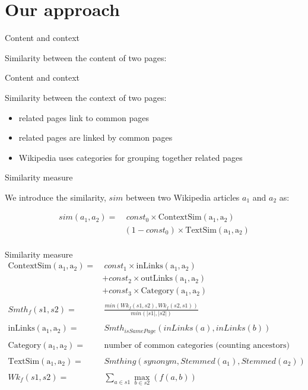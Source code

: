 \documentclass[xcolor=dvipsnames]{beamer}
\newcommand{\noargsim}{sim}
\newcommand{\wsim}[2]{\noargsim(#1,#2)}
\newcommand{\contextSim}[2]{\mathrm{ContextSim(#1,#2)}}
\newcommand{\textSim}[2]{\mathrm{TextSim(#1,#2)}}
\newcommand{\inLinks}[2]{\mathrm{inLinks(#1,#2)}}
\newcommand{\outLinks}[2]{\mathrm{outLinks(#1,#2)}}
\newcommand{\category}[2]{\mathrm{Category(#1,#2)}}
\newcommand{\wikiJack}[3]{Wk_#1(#2,#3)}
\newcommand{\Smthin}[3]{Smth_{#1}(#2,#3)}
\newcommand{\cst}[1]{const_#1}
\begin{document}
\section{Our approach}

\begin{frame}{Content and context}

Similarity between the content of two pages:




\end{frame}

\begin{frame}{Content and context}

Similarity between the context of two pages:

\begin{itemize}
\item related pages link to common pages 
\item related pages are linked by common pages
\item Wikipedia uses categories for grouping together related pages
\end{itemize}

\end{frame}

\begin{frame}{Similarity measure }

We introduce the similarity, $\noargsim$ between two Wikipedia articles $a_1$ and $a_2$ as:

\begin{align*}
	\wsim{a_1}{a_2} =&\ \cst{0} \times \contextSim{a_1}{a_2} \\
	& (1 - \cst{0}) \times \textSim{a_1}{a_2} \\
	\end{align*}


\end{frame}

\begin{frame}{Similarity measure }
	\begin{align*}
	\contextSim{a_1}{a_2} =&\  \cst{1} \times \inLinks{a_1}{a_2}\\
	 	& + \cst{2} \times \outLinks{a_1}{a_2}\\
	 	& + \cst{3} \times \category{a_1}{a_2}\\
	\\
	\Smthin{f}{s1}{s2} =&\ \frac{min(\wikiJack{f}{s1}{s2}, \wikiJack{f}{s2}{s1})}{min(|s1|,|s2|)}\\
\\
	\inLinks{a_1}{a_2} =&\ \Smthin{isSamePage}{inLinks(a)}{inLinks(b)}\\
	\\
	\category{a_1}{a_2} =&\  \text{number of common categories (counting ancestors)}\\
	\\
	\textSim{a_1}{a_2} =&\  Smthing(synonym,Stemmed(a_1),Stemmed(a_2))\\
	\\
	\wikiJack{f}{s1}{s2} =&\ \sum\limits_{a \in s1} \max\limits_{b \in s2}(f(a,b))\\
\end{align*}
\end{frame}
\end{document}
